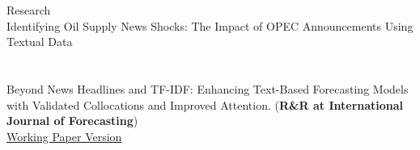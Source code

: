 \documentclass{resume}
\begin{document}
\begin{rSection}{Research}
    {\bf {}}\\
    Identifying Oil Supply News Shocks: The Impact of OPEC Announcements Using Textual Data\\\\
    {\bf {}}\\
    Beyond News Headlines and TF-IDF: Enhancing Text-Based Forecasting Models with Validated Collocations and Improved Attention.
    (\textbf{R\&R at International Journal of Forecasting})\\
    \href{https://papers.ssrn.com/sol3/papers.cfm?abstract_id=4822767#:~:text=This%20paper%20proposes%20a%20method%20for}{Working Paper Version}\\\\
    {\bf {}}\\
    \\
    \\
    \\
    \\
    \end{rSection}
\end{document}
